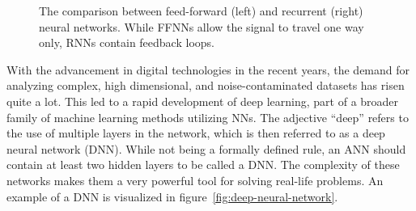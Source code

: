 \begin{figure}[!h]
\caption{The comparison between feed-forward (left) and recurrent (right) neural networks.
While FFNNs allow the signal to travel one way only, RNNs contain feedback loops.}
\label{fig:feedforward-vs-recurrent}
\end{figure}

With the advancement in digital technologies in the recent years,
the demand for analyzing complex, high dimensional, and noise-contaminated
datasets has risen quite a lot. This led to a rapid development of deep learning,
part of a broader family of machine learning methods utilizing NNs.
The adjective ``deep'' refers to the use of multiple layers in the network,
which is then referred to as a deep neural network (DNN).
While not being a formally defined rule, an ANN should contain at least
two hidden layers to be called a DNN.
The complexity of these networks makes them a very powerful tool
for solving real-life problems.
An example of a DNN is visualized in figure~\ref{fig:deep-neural-network}.


